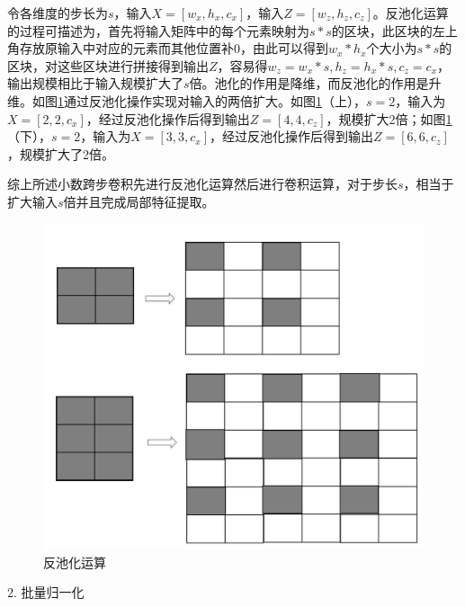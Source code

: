 令各维度的步长为$s$，输入$X=[w_{x}, h_{x}, c_{x}]$，输入$Z=[w_{z}, h_{z}, c_{z}]$。反池化运算的过程可描述为，首先将输入矩阵中的每个元素映射为$s*s$的区块，此区块的左上角存放原输入中对应的元素而其他位置补0，由此可以得到$w_{x}*h_{x}$个大小为$s*s$的区块，对这些区块进行拼接得到输出$Z$，容易得$w_{z}=w_{x}*s, h_{z} = h_{x}*s, c_{z}=c_{x}$，输出规模相比于输入规模扩大了$s$倍。池化的作用是降维，而反池化的作用是升维。如图\ref{fig:gan-unpooling}通过反池化操作实现对输入的两倍扩大。如图\ref{fig:gan-unpooling}（上），$s=2$，输入为$X=[2, 2, c_{x}]$，经过反池化操作后得到输出$Z=[4, 4, c_{z}]$，规模扩大2倍；如图\ref{fig:gan-unpooling}（下），$s=2$，输入为$X=[3, 3, c_{x}]$，经过反池化操作后得到输出$Z=[6, 6, c_{z}]$，规模扩大了2倍。

综上所述小数跨步卷积先进行反池化运算然后进行卷积运算，对于步长$s$，相当于扩大输入$s$倍并且完成局部特征提取。

\begin{figure}[H]
\centering
\includegraphics[scale=0.5]{figures/gan-unpooling.png}
\caption{反池化运算}
\label{fig:gan-unpooling}
\end{figure}

2. 批量归一化

